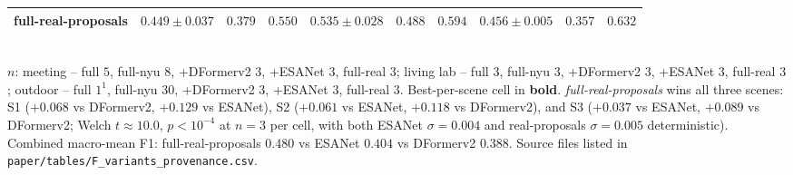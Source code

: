 \begin{table}[t]
{\begin{tabular}{l c c c c c c c c c}
full-real-proposals                & $\mathbf{0.449 \pm 0.037}$ & $\mathbf{0.379}$ & $\mathbf{0.550}$ & $\mathbf{0.535 \pm 0.028}$ & $\mathbf{0.488}$ & $\mathbf{0.594}$ & $\mathbf{0.456 \pm 0.005}$ & $\mathbf{0.357}$ & $\mathbf{0.632}$ \\
\bottomrule
\end{tabular}%
}
\\[2pt]
\footnotesize $n$: meeting -- full $5$, full-nyu $8$, +DFormerv2 $3$, +ESANet $3$, full-real $3$; living lab -- full $3$, full-nyu $3$, +DFormerv2 $3$, +ESANet $3$, full-real $3$; outdoor -- full $1^{1}$, full-nyu $30$, +DFormerv2 $3$, +ESANet $3$, full-real $3$. Best-per-scene cell in \textbf{bold}. \emph{full-real-proposals} wins all three scenes: S1 ($+0.068$ vs DFormerv2, $+0.129$ vs ESANet), S2 ($+0.061$ vs ESANet, $+0.118$ vs DFormerv2), and S3 ($+0.037$ vs ESANet, $+0.089$ vs DFormerv2; Welch $t{\approx}10.0$, $p{<}10^{-4}$ at $n{=}3$ per cell, with both ESANet $\sigma{=}0.004$ and real-proposals $\sigma{=}0.005$ deterministic). Combined macro-mean F1: full-real-proposals $0.480$ vs ESANet $0.404$ vs DFormerv2 $0.388$. Source files listed in \texttt{paper/tables/F\_variants\_provenance.csv}.
\end{table}
